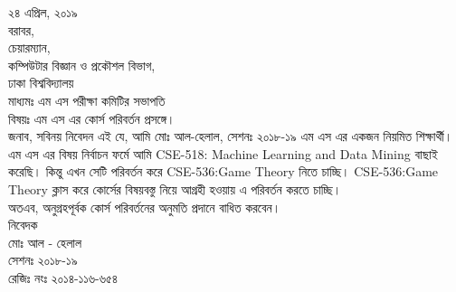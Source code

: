 \documentclass[a4paper]{article}
\begin{document}
\fontsize{17}{20}
\selectfont
\vfill
\noindent
২৪ এপ্রিল, ২০১৯\\ 

\noindent
বরাবর,\\ 
চেয়ারম্যান,\\ 
কম্পিউটার বিজ্ঞান ও প্রকৌশল বিভাগ,\\
ঢাকা বিশ্ববিদ্যালয়\\

\noindent
মাধ্যমঃ এম এস পরীক্ষা কমিটির সভাপতি\\

\noindent
বিষয়ঃ এম এস এর কোর্স পরিবর্তন প্রসঙ্গে।\\

\noindent
জনাব,
সবিনয় নিবেদন এই যে, আমি মোঃ আল-হেলাল, সেশনঃ ২০১৮-১৯ এম এস এর একজন নিয়মিত শিক্ষার্থী। এম এস এর বিষয় নির্বাচন ফর্মে আমি CSE-518: Machine Learning and Data Mining বাছাই করেছি। কিন্তু এখন সেটি পরিবর্তন করে CSE-536:Game Theory নিতে চাচ্ছি। CSE-536:Game Theory ক্লাস করে কোর্সের বিষয়বস্তু নিয়ে আগ্রহী হওয়ায় এ পরিবর্তন করতে চাচ্ছি।\\

\noindent
অতএব, অনুগ্রহপূর্বক কোর্স পরিবর্তনের অনুমতি প্রদানে বাধিত করবেন। \\

\noindent
নিবেদক\\
মোঃ আল - হেলাল\\
সেশনঃ ২০১৮-১৯\\
রেজিঃ নংঃ ২০১৪-১১৬-৬৫৪\\
\end{document}
